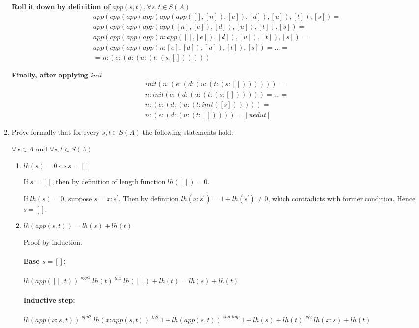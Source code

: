\documentclass{article}
\begin{document}
\begin{enumerate}
\textbf{Roll it down by definition of $app(s, t), \forall s, t \in S(A)$}
\begin{align*}
app(app(app(app(app(app([], [n]), [e]), [d]), [u]), [t]), [s]) =\\
app(app(app(app(app([n], [e]), [d]), [u]), [t]), [s]) = \\
app(app(app(app(n: app([], [e]), [d]), [u]), [t]), [s]) = \\
app(app(app(app(n: [e], [d]), [u]), [t]), [s]) = ... = \\
= n : (e : (d : (u : (t : (s : [])))))
\end{align*}

\textbf{Finally, after applying $init$}
\begin{align*}
init(n : (e : (d : (u : (t : (s : [])))))) =\\ n : init(e : (d : (u : (t : (s : []))))) = ... =\\ n : (e : (d : (u : (t : init([s]))))) =\\ n : (e : (d : (u : (t : [])))) = [nedut]
\end{align*}

\item Prove formally that for every $s, t \in S(A)$ the following statements hold:

$\forall x \in A$ and $\forall s, t \in S(A)$

\begin{enumerate}
\item $lh(s) = 0 \iff s = []$

If $s = []$, then by definition of length function $lh([]) = 0$.

If $lh(s) = 0$, suppose $s = x : s ^ \prime$. Then by definition $lh(x : s ^ \prime) = 1 + lh(s ^ \prime) \neq 0$, which contradicts with former condition. Hence $s = []$.

\item $lh(app(s, t)) = lh(s) + lh(t)$

Proof by induction.

\paragraph{Base $s = []$:}
$lh(app([], t)) \stackrel{app1}{=} lh(t) \stackrel{lh1}{=} lh([]) + lh(t) = lh(s) + lh(t)$

\paragraph{Inductive step:}
$lh(app(x : s, t)) \stackrel{app2}{=} lh(x : app(s, t)) \stackrel{lh2}{=} 1 + lh(app(s, t)) \stackrel{ind. hyp}{=} 1 + lh(s) + lh(t) \stackrel{lh2}{=} lh(x : s) + lh(t)$


\end{enumerate}
\end{enumerate}
\end{document}
